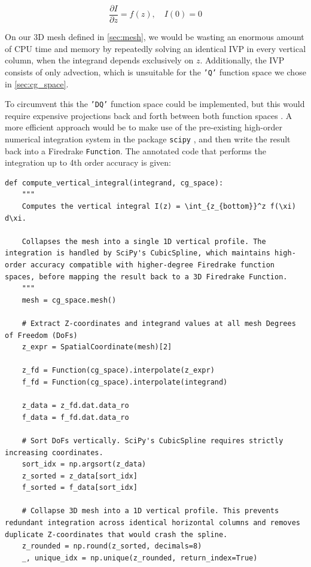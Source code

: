 \documentclass{article}
\begin{document}
\begin{appendices}
\begin{equation}
    \frac{\partial I}{\partial z} = f(z), \quad I(0)=0
\end{equation}

On our 3D mesh defined in \cref{sec:mesh}, we would be wasting an enormous amount of CPU time and memory by repeatedly solving an identical IVP in every vertical column, when the integrand depends exclusively on $z$.
Additionally, the IVP consists of only advection, which is unsuitable for the \texttt{'Q'} function space we chose in \cref{sec:cg_space}.

To circumvent this the \texttt{'DQ'} function space could be implemented, but this would require expensive projections back and forth between both function spaces \cite{FiredrakeUserManual}.
A more efficient approach would be to make use of the pre-existing high-order numerical integration system in the package \texttt{scipy} \cite{scipy}, and then write the result back into a Firedrake \texttt{Function}.
The annotated code that performs the integration up to 4th order accuracy is given:

\begin{verbatim}
def compute_vertical_integral(integrand, cg_space):
    """
    Computes the vertical integral I(z) = \int_{z_{bottom}}^z f(\xi) d\xi.
    
    Collapses the mesh into a single 1D vertical profile. The integration is handled by SciPy's CubicSpline, which maintains high-order accuracy compatible with higher-degree Firedrake function spaces, before mapping the result back to a 3D Firedrake Function.
    """
    mesh = cg_space.mesh()

    # Extract Z-coordinates and integrand values at all mesh Degrees of Freedom (DoFs)
    z_expr = SpatialCoordinate(mesh)[2]

    z_fd = Function(cg_space).interpolate(z_expr)
    f_fd = Function(cg_space).interpolate(integrand)

    z_data = z_fd.dat.data_ro
    f_data = f_fd.dat.data_ro

    # Sort DoFs vertically. SciPy's CubicSpline requires strictly increasing coordinates.
    sort_idx = np.argsort(z_data)
    z_sorted = z_data[sort_idx]
    f_sorted = f_data[sort_idx]

    # Collapse 3D mesh into a 1D vertical profile. This prevents redundant integration across identical horizontal columns and removes duplicate Z-coordinates that would crash the spline.
    z_rounded = np.round(z_sorted, decimals=8)
    _, unique_idx = np.unique(z_rounded, return_index=True)


\end{verbatim}
\end{appendices}
\end{document}
